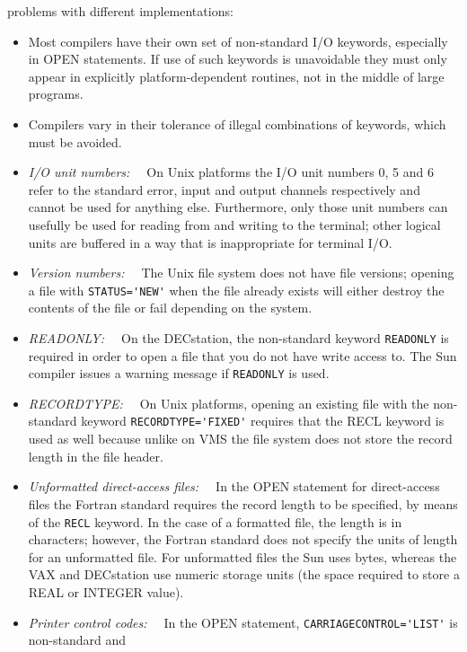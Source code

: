 \documentclass[twoside,11pt,nolof,noabs]{starlink}
\renewcommand{\_}{{\tt\char'137}}
\begin{document}
\begin{itemize}
  problems with different implementations:
  \begin{itemize}
   \item Most compilers have their own set of non-standard I/O keywords,
    especially in OPEN statements.  If use of such keywords is
    unavoidable they must only appear in explicitly platform-dependent
    routines, not in the middle of large programs.
   \item Compilers vary in their tolerance of illegal combinations of
    keywords, which must be avoided.
   \item \textit{I/O unit numbers:~~}
    On Unix platforms the I/O unit numbers 0, 5 and 6 refer to the standard
    error, input and output channels respectively and cannot be used for
    anything else.  Furthermore, only those unit numbers can usefully be used
    for reading from and writing to the terminal; other logical units are
    buffered in a way that is inappropriate for terminal I/O.
   \item \textit{Version numbers:~~}
    The Unix file system does not have file versions; opening a
    file with \verb|STATUS='NEW'| when the
    file already exists will either destroy
    the contents of the file or fail depending on the system.
   \item \textit{READONLY:~~}
    On the DECstation, the non-standard keyword \verb|READONLY| is required in
    order to open a file that you do not have write access to. The Sun
    compiler issues a warning message if \verb|READONLY| is used.
   \item \textit{RECORDTYPE:~~}
    On Unix platforms, opening an existing file with the non-standard
    keyword \verb|RECORDTYPE='FIXED'| requires
    that the RECL keyword is used as well because unlike on VMS the file
    system does not store the record length in the file header.
   \item \textit{Unformatted direct-access files:~~}
    In the OPEN statement for direct-access files the Fortran standard
    requires the record length to be specified, by means of the
    \verb|RECL| keyword.
    In the case of a formatted file, the length is in characters;  however,
    the Fortran standard does not specify the units of length for
    an unformatted file.  For unformatted files the Sun uses bytes, whereas
    the VAX and DECstation use numeric storage units (the space required
    to store a REAL or INTEGER value).
   \item \textit{Printer control codes:~~}
    In the OPEN statement, \verb|CARRIAGECONTROL='LIST'| is non-standard and

\end{itemize}
\end{itemize}
\end{document}

